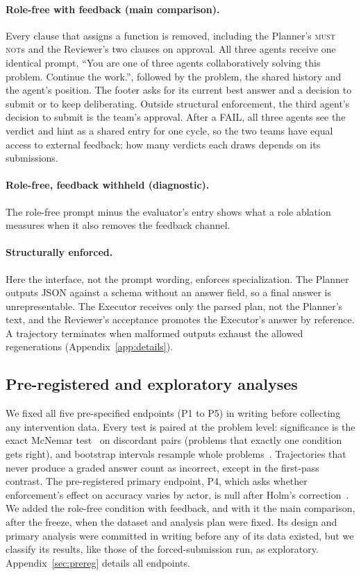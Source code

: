 \paragraph{Role-free with feedback (main comparison).} Every clause that
assigns a function is removed, including the Planner's \textsc{must not}s
and the Reviewer's two clauses on approval. All three agents receive one
identical prompt, ``You are one of three agents collaboratively solving
this problem. Continue the work.'', followed by the problem, the shared history and
the agent's position. The footer asks for its current best answer and a decision to
submit or to keep deliberating. Outside structural enforcement, the third agent's decision to submit is
the team's approval. After a FAIL, all three agents see the verdict and hint as a
shared entry for one cycle, so the two teams have equal access to external
feedback; how many verdicts each draws depends on its submissions.

\paragraph{Role-free, feedback withheld (diagnostic).} The role-free prompt
minus the evaluator's entry shows what a role ablation measures when it
also removes the feedback channel.

\paragraph{Structurally enforced.} Here the interface, not the prompt
wording, enforces specialization. The Planner outputs JSON against a schema
without an answer field, so a final answer is unrepresentable. The Executor receives only the parsed plan, not the
Planner's text, and the Reviewer's acceptance promotes the
Executor's answer by reference. A trajectory terminates when malformed
outputs exhaust the allowed regenerations (Appendix~\ref{app:details}).

\subsection{Pre-registered and exploratory analyses}
\label{subsec:prereg}

We fixed all five pre-specified endpoints (P1 to P5) in writing before
collecting any intervention data. Every test is paired at the problem
level: significance is the exact McNemar test~\cite{mcnemar1947note} on
discordant pairs (problems that exactly one condition gets right), and
bootstrap intervals resample whole problems~\cite{efron1979bootstrap}.
Trajectories that never produce a graded answer count as incorrect, except
in the first-pass contrast. The pre-registered primary endpoint, P4, which
asks whether enforcement's effect on accuracy varies by actor, is null after Holm's correction~\cite{holm1979simple}. We added the role-free condition with feedback, and with it the
main comparison, after the freeze, when the dataset and analysis plan were
fixed. Its design and primary analysis were committed in writing before
any of its data existed, but we classify its results, like those of the
forced-submission run, as exploratory. Appendix~\ref{sec:prereg} details
all endpoints.
